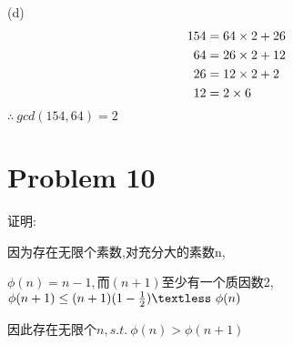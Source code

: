 \documentclass{article}
\begin{document}
(d) 
\begin{equation} \begin{split}
    \notag
    154 &= 64\times2   + 26 \\
        64 &= 26\times 2 + 12 \\
        26 &= 12\times 2 + 2\\
        12 &= 2\times 6
    \end{split} \end{equation}
$\therefore\ gcd(154,64)=2$
\section*{Problem 10}
证明:

因为存在无限个素数,对充分大的素数n,

$\phi(n)=n-1,$而$(n+1)$至少有一个质因数2,$\phi(n+1)\leq (n+1)(1-\frac{1}{2})\textless\ \phi(n)$

因此存在无限个$n,s.t.\ \phi(n)>\phi(n+1)$
\end{document}
